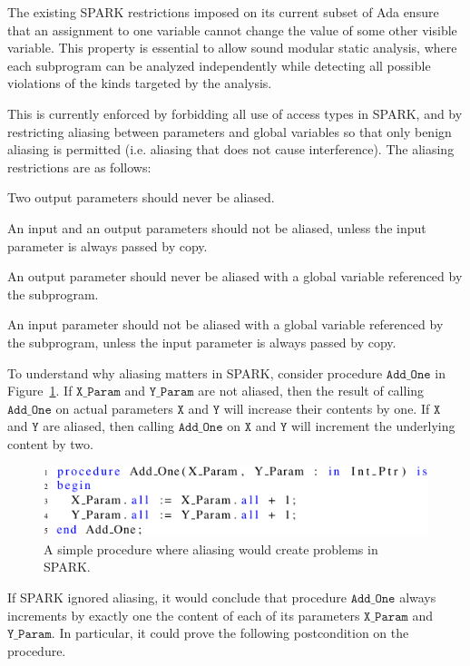 \documentclass{llncs}
\newcommand\var[1]{\ensuremath{\mathtt{#1}}}
\begin{document}
The existing SPARK restrictions imposed on its current subset of Ada ensure that an assignment to one variable cannot change the value of some other visible variable. This property is essential to allow sound modular static analysis,
where each subprogram can be analyzed independently while detecting all possible violations of the kinds targeted by the analysis.

This is currently enforced by forbidding all use of access types in SPARK, and by restricting aliasing between parameters and global variables so that only
benign aliasing is permitted (i.e. aliasing that does not cause interference).  The aliasing restrictions are as follows:


\begin{compactitem}
  \item Two output parameters should never be aliased.
  \item An input and an output parameters should not be aliased, unless the input parameter is always passed by copy.
  \item An output parameter should never be aliased with a global variable referenced by the subprogram.
  \item An input parameter should not be aliased with a global variable referenced by the subprogram, unless the input parameter is always passed by copy.
\end{compactitem}

\smallskip
To understand why aliasing matters in SPARK, consider procedure \var{Add\_One} in Figure~\ref{fig:spark_ex1}. If \var{X\_Param} and \var{Y\_Param}
are not aliased, then the result of calling \var{Add\_One} on actual parameters \var{X} and \var{Y} will increase their contents by one. If \var{X} and \var{Y} are aliased, then calling
\var{Add\_One} on \var{X} and \var{Y} will increment the underlying content by two.


\begin{figure}[htb!]
\centering
  \captionsetup{justification=centering,margin=0.6cm}
   \includegraphics[]{spark_ex1}
   \caption{A simple procedure where aliasing would create problems in SPARK.}
   \label{fig:spark_ex1}
\end{figure}

If SPARK ignored aliasing, it would conclude that procedure \var{Add\_One} always increments by exactly one the content of each of its parameters \var{X\_Param} and \var{Y\_Param}.
In particular, it could prove the following postcondition on the procedure.
\end{document}
